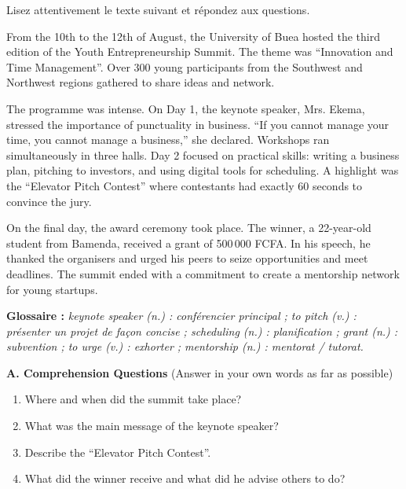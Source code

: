 \documentclass[11pt]{article}
\newcommand{\cle}[1]{{\popxbold\color{popdark}#1}}
\newcounter{popsec}
\newcounter{popsub}
\newcommand{\courssub}[1]{%
  \stepcounter{popsub}%
  \par\vspace{9pt}\noindent{\popxbold\fontsize{11.5}{13}\selectfont\color{popink}{\color{poporange}\thepopsec.\thepopsub}\hspace{6pt}#1}\par\nopagebreak\vspace{4pt}
}
\begin{document}
\courssub{Je me prépare au Bac}

\begin{exercice}
Lisez attentivement le texte suivant et répondez aux questions.
\begin{textebox}
From the 10th to the 12th of August, the University of Buea hosted the third edition of the Youth Entrepreneurship Summit. The \cle{theme} was “Innovation and Time Management”. Over 300 young \cle{participants} from the Southwest and Northwest regions gathered to \cle{share ideas} and \cle{network}.

The \cle{programme} was intense. On Day 1, the \cle{keynote speaker}, Mrs. Ekema, stressed the importance of \cle{punctuality} in business. “If you cannot manage your time, you cannot manage a business,” she declared. Workshops ran \cle{simultaneously} in three halls. Day 2 focused on practical skills: writing a business plan, \cle{pitching} to investors, and using digital tools for \cle{scheduling}. A highlight was the “Elevator Pitch Contest” where contestants had exactly 60 seconds to convince the jury.

On the final day, the \cle{award ceremony} took place. The winner, a 22-year-old student from Bamenda, received a grant of 500\,000 FCFA. In his speech, he thanked the \cle{organisers} and urged his peers to \cle{seize opportunities} and \cle{meet deadlines}. The summit ended with a commitment to create a \cle{mentorship} network for young startups.

\medskip
\textbf{Glossaire :} \textit{keynote speaker (n.) : conférencier principal ; to pitch (v.) : présenter un projet de façon concise ; scheduling (n.) : planification ; grant (n.) : subvention ; to urge (v.) : exhorter ; mentorship (n.) : mentorat / tutorat.}
\end{textebox}

\textbf{A. Comprehension Questions} (Answer in your own words as far as possible)
\begin{enumerate}
\item Where and when did the summit take place?
\item What was the main message of the keynote speaker?
\item Describe the “Elevator Pitch Contest”.
\item What did the winner receive and what did he advise others to do?
\end{enumerate}


\end{exercice}
\end{document}
